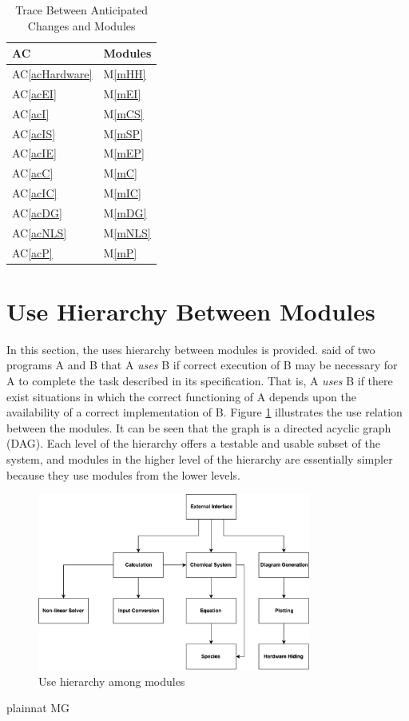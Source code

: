 \documentclass[12pt, titlepage]{article}
\newcommand{\acref}[1]{AC\ref{#1}}
\newcommand{\mref}[1]{M\ref{#1}}
\begin{document}
\begin{table}[H]
\centering
\begin{tabular}{p{} p{}}
\toprule
\textbf{AC} & \textbf{Modules}\\
\midrule
\acref{acHardware} & \mref{mHH}\\
\acref{acEI} & \mref{mEI}\\
\acref{acI} & \mref{mCS}\\
\acref{acIS} & \mref{mSP}\\
\acref{acIE} & \mref{mEP}\\
\acref{acC} & \mref{mC}\\
\acref{acIC} & \mref{mIC}\\
\acref{acDG} & \mref{mDG}\\
\acref{acNLS} & \mref{mNLS}\\
\acref{acP} & \mref{mP}\\
\bottomrule
\end{tabular}
\caption{Trace Between Anticipated Changes and Modules}
\label{TblACT}
\end{table}

\newpage
\section{Use Hierarchy Between Modules} \label{SecUse}

In this section, the uses hierarchy between modules is
provided. \citet{Parnas1978} said of two programs A and B that A {\em uses} B if
correct execution of B may be necessary for A to complete the task described in
its specification. That is, A {\em uses} B if there exist situations in which
the correct functioning of A depends upon the availability of a correct
implementation of B.  Figure \ref{FigUH} illustrates the use relation between
the modules. It can be seen that the graph is a directed acyclic graph
(DAG). Each level of the hierarchy offers a testable and usable subset of the
system, and modules in the higher level of the hierarchy are essentially simpler
because they use modules from the lower levels.

\begin{figure}[H]
\centering
\includegraphics[width=0.8\textwidth]{UsesHierarchy.pdf}
\caption{Use hierarchy among modules}
\label{FigUH}
\end{figure}


 {plainnat}
 {MG}
\end{document}
